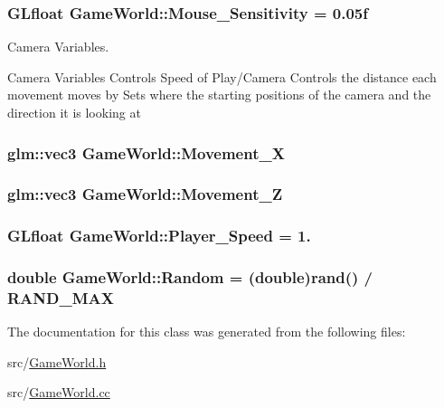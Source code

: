 \subsubsection[{Mouse\+\_\+\+Sensitivity}]{\setlength{\rightskip}{0pt plus 5cm}G\+Lfloat Game\+World\+::\+Mouse\+\_\+\+Sensitivity = 0.\+05f}\label{classGameWorld_a9bf4eb977e6ab9299aaef1345c4fa4dd}


Camera Variables. 

Camera Variables Controls Speed of Play/\+Camera Controls the distance each movement moves by Sets where the starting positions of the camera and the direction it is looking at \hypertarget{classGameWorld_a968eb29424b68f7cd79a5896c62e944d}{}
\subsubsection[{Movement\+\_\+\+X}]{\setlength{\rightskip}{0pt plus 5cm}glm\+::vec3 Game\+World\+::\+Movement\+\_\+\+X}\label{classGameWorld_a968eb29424b68f7cd79a5896c62e944d}
\hypertarget{classGameWorld_a8dd30ba92e7fa9b9b05075e31d1e7dd8}{}
\subsubsection[{Movement\+\_\+\+Z}]{\setlength{\rightskip}{0pt plus 5cm}glm\+::vec3 Game\+World\+::\+Movement\+\_\+\+Z}\label{classGameWorld_a8dd30ba92e7fa9b9b05075e31d1e7dd8}
\hypertarget{classGameWorld_ae8ab2ac372729cec44ea316f6bdf45ca}{}
\subsubsection[{Player\+\_\+\+Speed}]{\setlength{\rightskip}{0pt plus 5cm}G\+Lfloat Game\+World\+::\+Player\+\_\+\+Speed = 1.}\label{classGameWorld_ae8ab2ac372729cec44ea316f6bdf45ca}
\hypertarget{classGameWorld_a56652cc9880b3ba1be61395066c863c3}{}
\subsubsection[{Random}]{\setlength{\rightskip}{0pt plus 5cm}double Game\+World\+::\+Random = (double)rand() / R\+A\+N\+D\+\_\+\+M\+A\+X}\label{classGameWorld_a56652cc9880b3ba1be61395066c863c3}


The documentation for this class was generated from the following files\+:\begin{DoxyCompactItemize}
\item 
src/\hyperlink{GameWorld_8h}{Game\+World.\+h}\item 
src/\hyperlink{GameWorld_8cc}{Game\+World.\+cc}\end{DoxyCompactItemize}
